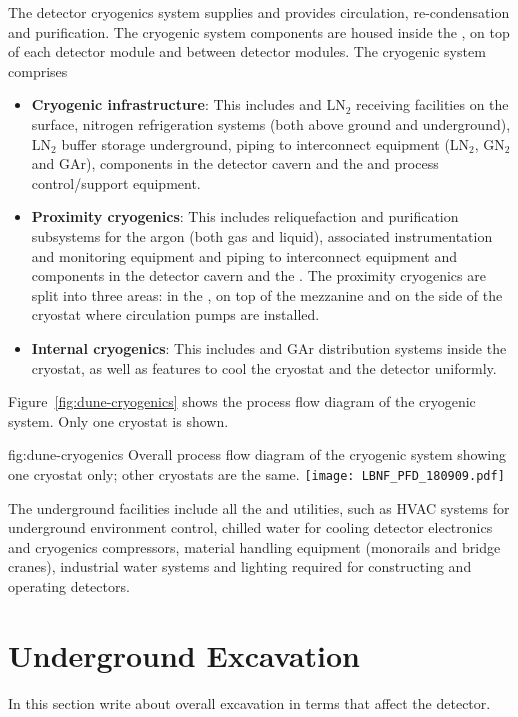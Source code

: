 The detector cryogenics system supplies  and provides
circulation, re-condensation and purification. The cryogenic system
components are housed inside the , on top of each detector module
and between detector modules. The cryogenic system comprises
\begin{itemize}
\item {\bf Cryogenic infrastructure}: This includes  and LN$_2$ receiving
  facilities on the surface, nitrogen refrigeration systems (both
  above ground and underground), LN$_2$ buffer storage
  underground, piping to interconnect equipment (LN$_2$, GN$_2$ and GAr),
  components in the detector cavern and the  and process control/support
  equipment.
\item {\bf Proximity cryogenics}: This includes reliquefaction 
  and
  purification subsystems for the argon (both gas and liquid), associated
  instrumentation and monitoring equipment and  piping to
  interconnect equipment and components in the detector cavern and the
  . The proximity cryogenics are split into three areas: in the
  , on top of the mezzanine and on the side of the cryostat 
  where  circulation pumps are installed.
\item {\bf Internal cryogenics}: This includes  and GAr distribution
  systems inside the cryostat, as well as features to cool the
  cryostat and the detector uniformly.
\end{itemize}
Figure~\ref{fig:dune-cryogenics} shows the process flow diagram of the
 cryogenic system. Only one cryostat is shown.
\begin{dunefigure}{fig:dune-cryogenics}
  {Overall process flow diagram of the cryogenic system showing one
    cryostat only; other cryostats are the same.}
  \texttt{[image: LBNF\_PFD\_180909.pdf]}
\end{dunefigure}


The underground facilities include all the  and utilities,
such as HVAC systems for underground environment control, chilled
water for cooling detector electronics and cryogenics compressors,
material handling equipment (monorails and bridge cranes), industrial
water systems and lighting required for constructing and operating
detectors.

\section{Underground Excavation}
\label{sec:fdsp-coord-uderground-excavation}
In this section write about overall excavation in terms that affect the detector. 

